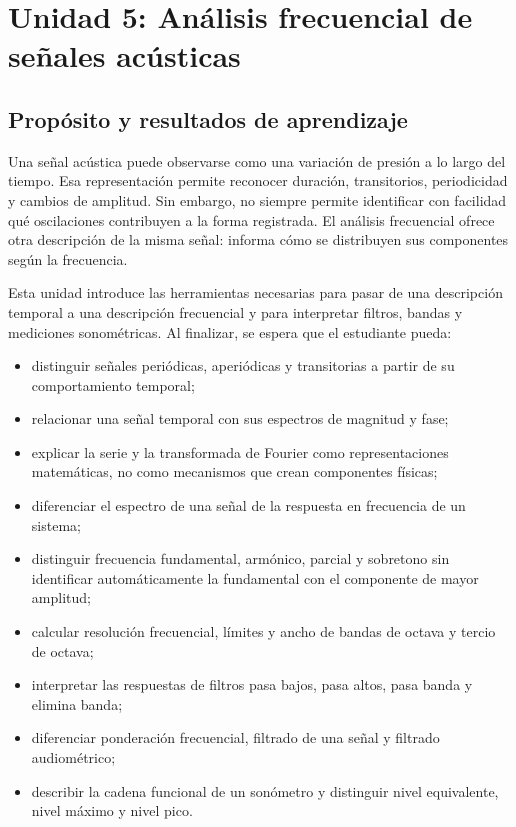 \chapter{Unidad 5: Análisis frecuencial de señales acústicas}
\label{chap:unidad-5}

\section{Propósito y resultados de aprendizaje}
\label{sec:u5-proposito}

Una señal acústica puede observarse como una variación de presión a lo largo
del tiempo. Esa representación permite reconocer duración, transitorios,
periodicidad y cambios de amplitud. Sin embargo, no siempre permite identificar
con facilidad qué oscilaciones contribuyen a la forma registrada. El análisis
frecuencial ofrece otra descripción de la misma señal: informa cómo se
distribuyen sus componentes según la frecuencia.

Esta unidad introduce las herramientas necesarias para pasar de una descripción
temporal a una descripción frecuencial y para interpretar filtros, bandas y
mediciones sonométricas. Al finalizar, se espera que el estudiante pueda:

\begin{itemize}
    \item distinguir señales periódicas, aperiódicas y transitorias a partir de
    su comportamiento temporal;
    \item relacionar una señal temporal con sus espectros de magnitud y fase;
    \item explicar la serie y la transformada de Fourier como representaciones
    matemáticas, no como mecanismos que crean componentes físicas;
    \item diferenciar el espectro de una señal de la respuesta en frecuencia de
    un sistema;
    \item distinguir frecuencia fundamental, armónico, parcial y sobretono sin
    identificar automáticamente la fundamental con el componente de mayor
    amplitud;
    \item calcular resolución frecuencial, límites y ancho de bandas de octava
    y tercio de octava;
    \item interpretar las respuestas de filtros pasa bajos, pasa altos, pasa
    banda y elimina banda;
    \item diferenciar ponderación frecuencial, filtrado de una señal y filtrado
    audiométrico;
    \item describir la cadena funcional de un sonómetro y distinguir nivel
    equivalente, nivel máximo y nivel pico.
\end{itemize}

